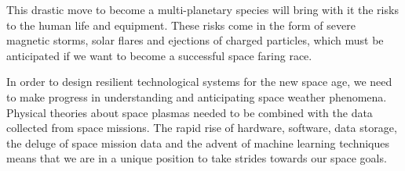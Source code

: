 This drastic move to become a multi-planetary species will bring with it the risks to the human 
life and equipment. These risks come in the form of severe magnetic storms, solar flares and 
ejections of charged particles, which must be anticipated if we want to become a successful space 
faring race. 

In order to design resilient technological systems for the new space age, we need to make progress 
in understanding and anticipating space weather phenomena. Physical theories about space plasmas 
needed to be combined with the data collected from space missions. The rapid rise of hardware, 
software, data storage, the deluge of space mission data and the advent of machine learning 
techniques means that we are in a unique position to take strides towards our space goals.

\clearpage
%
%

